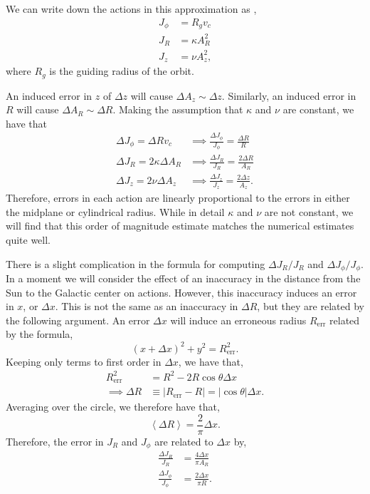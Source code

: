 \documentclass[twocolumn]{aastex62}
\newcommand{\abs}[1]{\left| #1 \right|}
\newcommand{\avg}[1]{\left< #1 \right>}
\newcommand{\beq}{\begin{equation}}
\newcommand{\eeq}{\end{equation}}
\begin{document}
We can write down the actions in this approximation as
\citep[Section~3.5.3b][]{2008gady.book.....B},
\beq\label{eq:actions_epi}
\begin{split}
J_{\phi} &= R_g v_c \\
J_R &= \kappa A_R^2 \\
J_z &= \nu A_z^2\text{,}
\end{split}
\eeq
where $R_g$ is the guiding radius of the orbit.

An induced error in $z$ of $\Delta z$ will cause $\Delta A_z \sim \Delta z$.
Similarly, an induced error in $R$ will cause $\Delta A_R \sim \Delta R$.
Making the assumption that $\kappa$ and $\nu$ are constant, we have that
\beq\label{eq:actions_epi_error}
\begin{split}
\Delta J_{\phi} = \Delta R v_c &\implies \frac{\Delta J_{\phi}}{J_{\phi}} = \frac{\Delta R}{R} \\
\Delta J_R = 2 \kappa \Delta A_R &\implies \frac{\Delta J_R}{J_R} = \frac{2\Delta R}{A_R} \\
\Delta J_z = 2 \nu \Delta A_z &\implies \frac{\Delta J_z}{J_z} = \frac{2\Delta z}{A_z}\text{.}
\end{split}
\eeq
Therefore, errors in each action are linearly proportional to the errors in
either the midplane or cylindrical radius. While in detail $\kappa$ and $\nu$
are not constant, we will find that this order of magnitude estimate matches
the numerical estimates quite well.

There is a slight complication in the formula for computing $\Delta J_R/J_R$
and $\Delta J_{\phi}/J_{\phi}$. In a moment we will consider the effect of an inaccuracy
in the distance from the Sun to the Galactic center on actions. However, this
inaccuracy induces an error in $x$, or $\Delta x$. This is not the same as an
inaccuracy in $\Delta R$, but they are related by the following argument. An
error $\Delta x$ will induce an erroneous radius $R_{\text{err}}$ related by
the formula,
\beq
(x+\Delta x)^2 + y^2 = R_{\text{err}}^2\text{.}
\eeq
Keeping only terms to first order in $\Delta x$, we have that,
\beq
\begin{split}
R_{\text{err}}^2 &= R^2 - 2 R \cos{\theta} \Delta x \\
\implies \Delta R &\equiv \abs{R_{\text{err}} - R} = \abs{\cos{\theta}} \Delta x\text{.}
\end{split}
\eeq
Averaging over the circle, we therefore have that,
\beq
\avg{\Delta R} = \frac{2}{\pi} \Delta x\text{.}
\eeq
Therefore, the error in $J_R$ and $J_{\phi}$ are related to $\Delta x$ by,
\beq\label{eq:Jr_epi_dx}
\begin{split}
\frac{\Delta J_R}{J_R} &= \frac{4 \Delta x}{\pi A_R} \\
\frac{\Delta J_{\phi}}{J_{\phi}} &= \frac{2 \Delta x}{\pi R}\text{.}
\end{split}
\eeq
\end{document}
